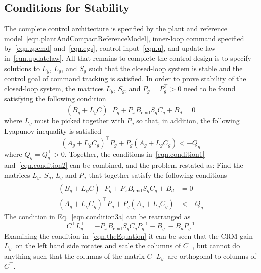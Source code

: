\subsection{Conditions for Stability}

The complete control architecture is specified by the plant and reference model\ \eqref{eqn.plantAndCompactReferenceModel}, inner-loop command specified by\ \eqref{eqn.zpcmd} and\ \eqref{eqn.egs}, control input\ \eqref{eqn.u}, and update law in\ \eqref{eqn.updatelaw}.
All that remains to complete the control design is to specify solutions to $L_{y}$, $L_{g}$, and $S_{g}$ such that the closed-loop system is stable and the control goal of command tracking is satisfied.
In order to prove stability of the closed-loop system, the matrices $L_{y}$, $S_{g}$, and $P_{g}=P_{g}^{\top}>0$ need to be found satisfying the following condition
\begin{equation}
  \label{eqn.condition1}
  (B_{g}+L_{y}C)^{\top}P_{g} + P_{x}B_{\text{cmd}}S_{g}C_{g} + B_{d} = 0
\end{equation}
where $L_{g}$ must be picked together with $P_{g}$ so that, in addition, the following Lyapunov inequality is satisfied
  \begin{equation}
  \label{eqn.condition2}
  (A_{g}+L_{g}C_{g})^{\top}P_{g}+P_{g}(A_{g}+L_{g}C_{g}) < -Q_{g}
\end{equation}
where $Q_{g}=Q_{g}^{\top}>0$.
Together, the conditions in\ \eqref{eqn.condition1} and\ \eqref{eqn.condition2} can be combined, and the problem restated as: Find the matrices $L_{y}$, $S_{g}$, $L_{g}$ and $P_{g}$ that together satisfy the following conditions
\begin{align}
  \label{eqn.condition3a}
  (B_{g}+L_{y}C)^{\top}P_{g} + P_{x}B_{\text{cmd}}S_{g}C_{g} + B_{d} &= 0 \\
  \label{eqn.condition3b}
  (A_{g}+L_{g}C_{g})^{\top}P_{g}+P_{g}(A_{g}+L_{g}C_{g}) &< -Q_{g}
\end{align}
The condition in Eq.\ \eqref{eqn.condition3a} can be rearranged as
\begin{equation}
  \label{eqn.theEquation}
  C^{\top}L_{y}^{\top} = - P_{x}B_{\text{cmd}}S_{g}C_{g}P_{g}^{-1} - B_{g}^{\top} - B_{d}P_{g}^{-1}
\end{equation}
Examining the condition in\ \eqref{eqn.theEquation} it can be seen that the CRM gain $L_{y}^{\top}$ on the left hand side rotates and scale the columns of $C^{\top}$, but cannot do anything such that the columns of the matrix $C^{\top}L_{y}^{\top}$ are orthogonal to columns of $C^{\top}$.
